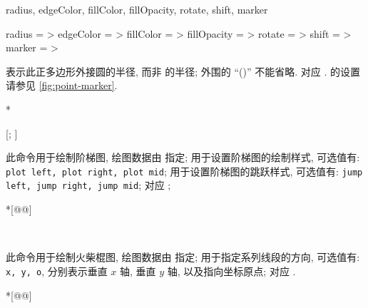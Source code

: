 \documentclass[
  hyper, lang=cn, 
  class=l3dox, 
]{../../zlatex/code/ztex}
\begin{document}
\begin{keyval}[parent=ztikz/polygon]{
  radius, edgeColor, fillColor, fillOpacity, 
  rotate, shift, marker}
  \begin{syntax}
    radius      = >
    edgeColor   = >
    fillColor   = >
    fillOpacity = >
    rotate      = >
    shift       = >
    marker      = >
  \end{syntax}
   表示此正多边形外接圆的半径, 而非  的半径; 
  外围的 ``()'' 不能省略.  对应 .  的设置
  请参见 \cref{fig:point-marker}.
\end{keyval}
\begin{DocExample}*
\end{DocExample}


\begin{function}[added=2025-05-15]{\StairsPlot}
  \begin{syntax}
    [; ]
    ~~~~~~~~~~~
  \end{syntax}
  此命令用于绘制阶梯图, 绘图数据由  指定;  用于设置阶梯图的绘制样式, 
  可选值有: \texttt{plot left, plot right, plot mid};  用于设置阶梯图的跳跃样式,
  可选值有: \texttt{jump left, jump right, jump mid};  对应 ;
\end{function}
\begin{DocExample}*[@@]
\end{DocExample}


\begin{function}[added=2025-05-15]{\StemPlot}
  \begin{syntax}
    ~~~~~~~~~
  \end{syntax}
  此命令用于绘制火柴棍图, 绘图数据由  指定;  用于指定系列线段的方向, 
  可选值有: \texttt{x, y, o}, 分别表示垂直 $x$ 轴, 垂直 $y$ 轴, 以及指向坐标原点;  对应 .
\end{function}
\begin{DocExample}*[@@]
\end{DocExample}
\end{document}
